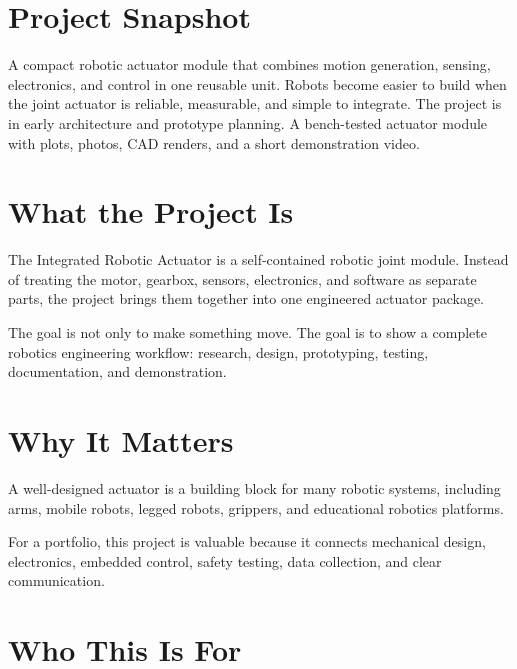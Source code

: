 \documentclass[public]{nervtech-overview}
\begin{document}
\maketitle
\tableofcontents
\newpage

\section{Project Snapshot}

\projectsnapshot
  {A compact robotic actuator module that combines motion generation, sensing, electronics, and control in one reusable unit.}
  {Robots become easier to build when the joint actuator is reliable, measurable, and simple to integrate.}
  {The project is in early architecture and prototype planning.}
  {A bench-tested actuator module with plots, photos, CAD renders, and a short demonstration video.}

\section{What the Project Is}

\begin{overviewbox}
The Integrated Robotic Actuator is a self-contained robotic joint module. Instead of treating the motor, gearbox, sensors, electronics, and software as separate parts, the project brings them together into one engineered actuator package.
\end{overviewbox}

The goal is not only to make something move. The goal is to show a complete robotics engineering workflow: research, design, prototyping, testing, documentation, and demonstration.

\section{Why It Matters}

\begin{valuebox}
A well-designed actuator is a building block for many robotic systems, including arms, mobile robots, legged robots, grippers, and educational robotics platforms.
\end{valuebox}

For a portfolio, this project is valuable because it connects mechanical design, electronics, embedded control, safety testing, data collection, and clear communication.

\section{Who This Is For}
\end{document}
